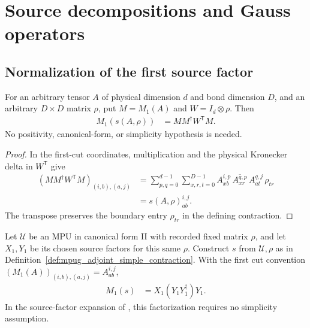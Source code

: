 \section{Source decompositions and Gauss operators}

\subsection{Normalization of the first source factor}

\begin{lemma}
    \label{thm:mpug_raw_first_cut_contraction}
    \leanok
    For an arbitrary tensor $A$ of physical dimension $d$ and bond
    dimension $D$, and an arbitrary $D\times D$ matrix $\rho$, put
    $M=M_1(A)$ and $W=I_d\otimes\rho$. Then
    \begin{align}
        M_1(s(A,\rho)) & =MM^\dagger W^{\mathsf T}M.
        \label{eq:mpug_raw_first_cut_contraction}
    \end{align}
    No positivity, canonical-form, or simplicity hypothesis is needed.
\end{lemma}
\begin{proof}\leanok
    In the first-cut coordinates, multiplication and the physical
    Kronecker delta in $W^{\mathsf T}$ give
    \begin{align}
        (MM^\dagger W^{\mathsf T}M)_{(i,b),(a,j)}
         & =\sum_{p,q=0}^{d-1}\sum_{x,r,t=0}^{D-1}
        A^{i,p}_{xb}\,\overline{A^{q,p}_{xr}}\,
        A^{q,j}_{at}\,\rho_{tr}                    \\
         & =s(A,\rho)^{i,j}_{ab}.
    \end{align}
    The transpose preserves the boundary entry $\rho_{tr}$ in the
    defining contraction.
\end{proof}

\begin{lemma}
    \label{thm:mpug_first_cut_adjoint_contraction}
    \leanok
    Let $\mathcal U$ be an MPU in canonical form II with recorded fixed
    matrix $\rho$, and let $X_1,Y_1$ be its chosen source factors for this
    same $\rho$. Construct $s$ from $\mathcal U,\rho$ as in
    Definition~\ref{def:mpug_adjoint_simple_contraction}. With the first
    cut convention $(M_1(A))_{(i,b),(a,j)}=A^{i,j}_{ab}$,
    \begin{align}
        M_1(s) & =X_1(Y_1Y_1^\dagger)Y_1.
        \label{eq:mpug_first_cut_adjoint_contraction}
    \end{align}
    In the source-factor expansion of
    \cite[lines~1326--1374]{FrancoRubio2025MPUGauging}, this factorization
    requires no simplicity assumption.
\end{lemma}

